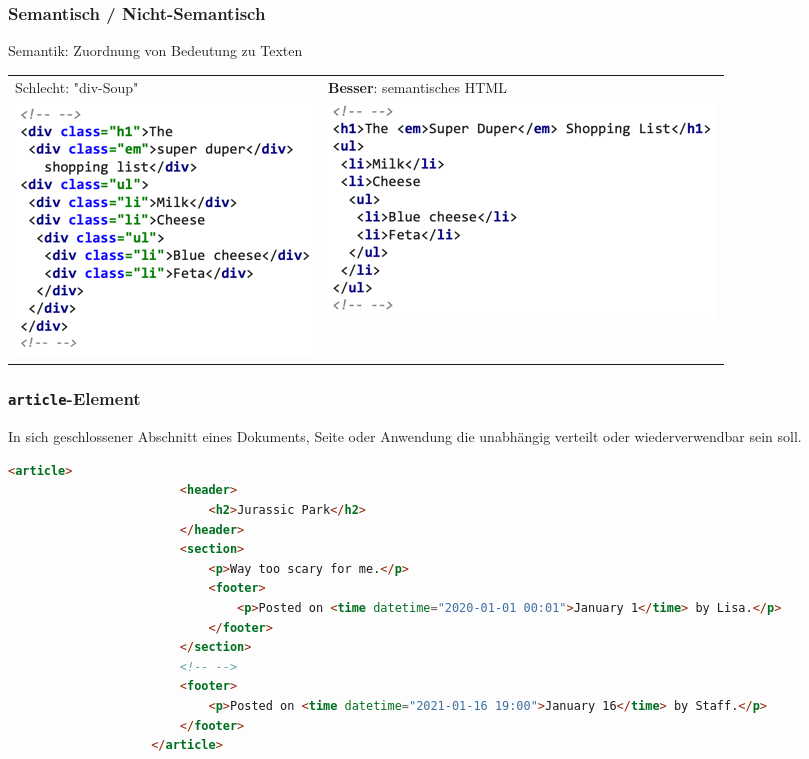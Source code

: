 \documentclass[a4paper, landscape, 8pt]{scrartcl}
\begin{document}
\begin{multicols*}{4}
        \subsubsection{Semantisch / Nicht-Semantisch}
        Semantik: Zuordnung von Bedeutung zu Texten \\
        \begin{tabularx}{\columnwidth}{l | X}
            Schlecht: "div-Soup" & \textbf{Besser}: semantisches HTML \\
            \includegraphics[scale=0.3]{graphic/01-div-soup} &
            \includegraphics[scale=0.25]{graphic/02-semantic-html}
        \end{tabularx}

        \subsubsection{\texttt{article}-Element}
        In sich geschlossener Abschnitt eines Dokuments, Seite oder Anwendung die unabhängig verteilt oder wiederverwendbar sein soll. \\
        \begin{lstlisting}[language=HTML]
                    <article>
                        <header>
                            <h2>Jurassic Park</h2>
                        </header>
                        <section>
                            <p>Way too scary for me.</p>
                            <footer>
                                <p>Posted on <time datetime="2020-01-01 00:01">January 1</time> by Lisa.</p>
                            </footer>
                        </section>
                        <!-- -->
                        <footer>
                            <p>Posted on <time datetime="2021-01-16 19:00">January 16</time> by Staff.</p>
                        </footer>
                    </article>
        \end{lstlisting}


\end{multicols*}
\end{document}
